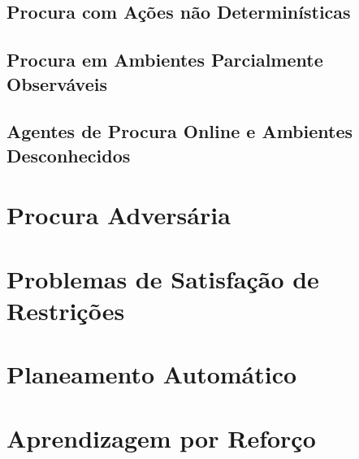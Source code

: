\documentclass[12pt]{article}
\begin{document}
\subsection{Procura com Ações não Determinísticas}



\subsection{Procura em Ambientes Parcialmente Observáveis}



\subsection{Agentes de Procura Online e Ambientes Desconhecidos}



\newpage

\section{Procura Adversária}



\newpage

\section{Problemas de Satisfação de Restrições}



\newpage

\section{Planeamento Automático}



\newpage

\section{Aprendizagem por Reforço}
\end{document}
